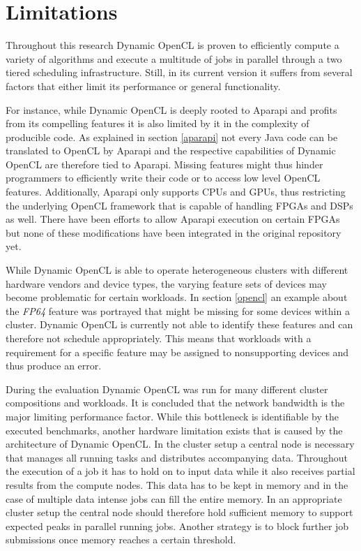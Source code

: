 \chapter{Limitations}

Throughout this research Dynamic OpenCL is proven to efficiently compute a variety of algorithms and  execute a multitude of jobs in parallel through a two tiered scheduling infrastructure. Still, in its current version it suffers from several factors that either limit its performance or general functionality.

For instance, while Dynamic OpenCL is deeply rooted to Aparapi and profits from its compelling features it is also limited by it in the complexity of producible code. As explained in section \ref{aparapi} not every Java code can be translated to OpenCL by Aparapi and the respective capabilities of Dynamic OpenCL are therefore tied to Aparapi. Missing features might thus hinder programmers to efficiently write their code or to access low level OpenCL features. Additionally, Aparapi only supports CPUs and GPUs, thus restricting the underlying OpenCL framework that is capable of handling FPGAs and DSPs as well. There have been efforts to allow Aparapi execution on certain FPGAs but none of these modifications have been integrated in the original repository yet\cite{aparapi_ucores}.

While Dynamic OpenCL is able to operate heterogeneous clusters with different hardware vendors and device types, the varying feature sets of devices may become problematic for certain workloads. In section \ref{opencl} an example about the \textit{FP64} feature was portrayed that might be missing for some devices within a cluster. Dynamic OpenCL is currently not able to identify these features and can therefore not schedule appropriately. This means that workloads with a requirement for a specific feature may be assigned to nonsupporting devices and thus produce an error.

During the evaluation Dynamic OpenCL was run for many different cluster compositions and workloads. It is concluded that the network bandwidth is the major limiting performance factor. While this bottleneck is identifiable by the executed benchmarks, another hardware limitation exists that is caused by the architecture of Dynamic OpenCL. In the cluster setup a central node is necessary that manages all running tasks and distributes accompanying data. Throughout the execution of a job it has to hold on to input data while it also receives partial results from the compute nodes. This data has to be kept in memory and in the case of multiple data intense jobs can fill the entire memory. In an appropriate cluster setup the central node should therefore hold sufficient memory to support expected peaks in parallel running jobs. Another strategy is to block further job submissions once memory reaches a certain threshold.


